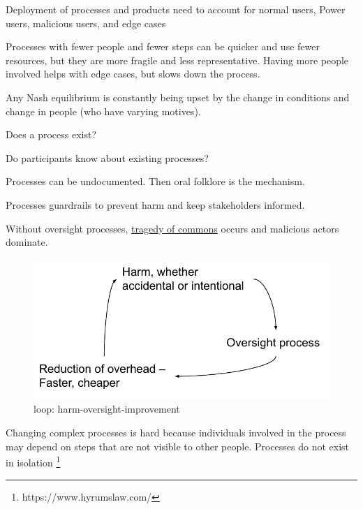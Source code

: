 Deployment of processes and products need to account for 
normal users, Power users, malicious users, and edge cases



Processes with fewer people and fewer steps can be quicker and use fewer resources, but they are more fragile and less representative. Having more people involved helps with edge cases, but slows down the process. 

Any Nash equilibrium is constantly being upset by the change in conditions and change in people (who have varying motives).


Does a process exist?


Do participants know about existing processes?


Processes can be undocumented. Then oral folklore is the mechanism. 
    
Processes guardrails to prevent harm and keep stakeholders informed. 
    
Without oversight processes, \href{https://en.wikipedia.org/wiki/Tragedy_of_the_commons}{tragedy of commons} occurs and malicious actors dominate.
    


\begin{figure}
    \centering
    \includegraphics{images/process_loop_harm-oversight-improvement}
    \caption{loop: harm-oversight-improvement}
    \label{fig:harm-oversight-improvement}
\end{figure}


Changing complex processes is hard because individuals involved in the process may depend on steps that are not visible to other people.
Processes do not exist in isolation
\footnote{https://www.hyrumslaw.com/} %
